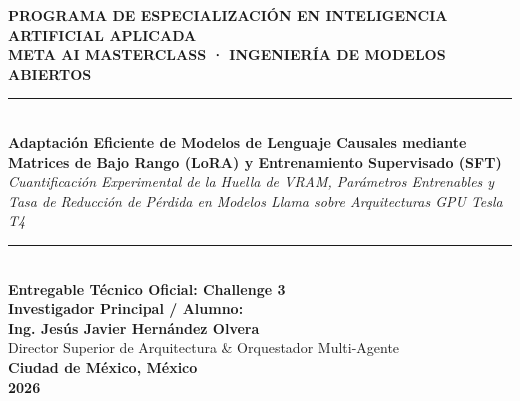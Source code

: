 \documentclass[12pt,letterpaper]{article}
\begin{document}
\begin{titlepage}
  \centering
  \vspace*{1.5cm}
  
  {\Large\textbf{PROGRAMA DE ESPECIALIZACIÓN EN INTELIGENCIA ARTIFICIAL APLICADA}}\\[0.8cm]
  {\large\textbf{META AI MASTERCLASS · INGENIERÍA DE MODELOS ABIERTOS}}\\[1.5cm]
  
  \rule{\linewidth}{0.6mm}\\[0.5cm]
  {\LARGE\textbf{Adaptación Eficiente de Modelos de Lenguaje Causales mediante Matrices de Bajo Rango (LoRA) y Entrenamiento Supervisado (SFT)}}\\[0.3cm]
  {\large\textit{Cuantificación Experimental de la Huella de VRAM, Parámetros Entrenables y Tasa de Reducción de Pérdida en Modelos Llama sobre Arquitecturas GPU Tesla T4}}\\[0.2cm]
  \rule{\linewidth}{0.6mm}\\[2cm]
  
  \textbf{Entregable Técnico Oficial: Challenge 3}\\[0.8cm]
  
  \textbf{Investigador Principal / Alumno:}\\
  {\Large\textbf{Ing. Jesús Javier Hernández Olvera}}\\[0.3cm]
  {\small Director Superior de Arquitectura \& Orquestador Multi-Agente}\\[2.5cm]
  
  \textbf{Ciudad de México, México}\\[0.2cm]
  \textbf{2026}
\end{titlepage}

\newpage
\tableofcontents
\newpage

\end{document}
